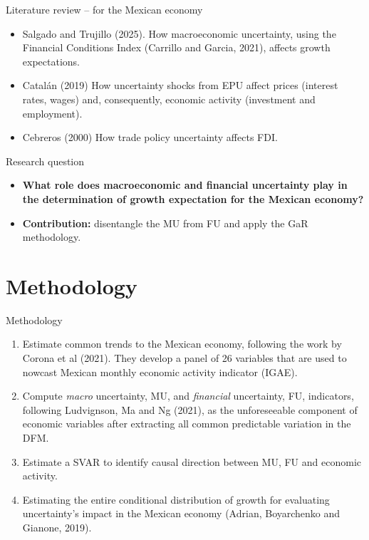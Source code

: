 \documentclass[handout,aspectratio=169,11pt,xcolor={dvipsnames},hyperref={pdftex,pdfpagemode=UseNone,hidelinks,pdfdisplaydoctitle=true},usepdftitle=false]{beamer}
\begin{document}

\begin{frame}{Literature review -- for the Mexican economy}
\begin{itemize}
\item Salgado and Trujillo (2025). How macroeconomic uncertainty, using the Financial Conditions Index (Carrillo and Garcia, 2021), affects growth expectations.
\item  Catal\'an (2019) How uncertainty shocks from EPU affect prices (interest rates, wages) and, consequently, economic activity (investment and employment).
\item  Cebreros (2000) How trade policy uncertainty affects FDI.

\end{itemize}
\end{frame}

\begin{frame}{Research question}
\begin{itemize}
\item \textbf{What role does macroeconomic and financial uncertainty play in the determination of growth expectation for the Mexican economy?}

\item \textbf{Contribution:} disentangle the MU from FU and apply the GaR methodology.

\end{itemize}

\end{frame}

\section{Methodology}
\begin{frame}{Methodology}
\begin{enumerate}
\item Estimate common trends to the Mexican economy, following the work by Corona et al (2021). They develop a panel of 26 variables that are used to nowcast Mexican monthly economic activity indicator (IGAE).
\item Compute \textit{macro} uncertainty, MU, and \textit{financial} uncertainty, FU, indicators, following Ludvignson, Ma and Ng (2021), as the unforeseeable component of economic variables after extracting all common predictable variation in the DFM.
\item Estimate a SVAR to identify causal direction between MU, FU and economic activity. 
\item Estimating the entire conditional distribution of growth for evaluating uncertainty’s impact in the Mexican economy (Adrian, Boyarchenko and Gianone, 2019).
\end{enumerate}
\end{frame}
\end{document}
